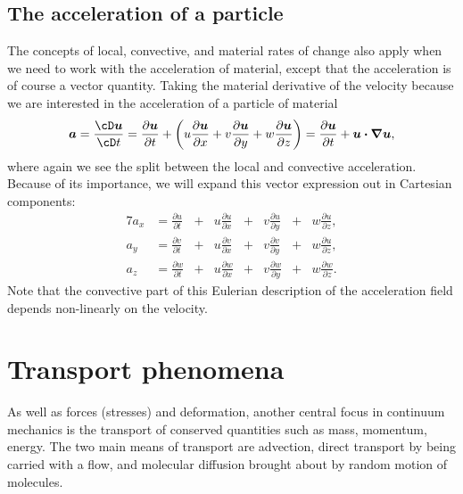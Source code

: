 \documentclass[twoside,11pt]		{report}
\begin{document}
\subsection{The acceleration of a particle}

The concepts of local, convective, and material rates of change also
apply when we need to work with the acceleration of material, except
that the acceleration is of course a vector quantity. Taking the
material derivative of the velocity because we are interested in the
acceleration of a particle of material
\[
\bm{a}=\frac{\cD\bm{u}}{\cD t}=
  \frac{\partial\bm{u}}{\partial t}+
  \left(u\frac{\partial\bm{u}}{\partial x}+
        v\frac{\partial\bm{u}}{\partial y}+
        w\frac{\partial\bm{u}}{\partial z}\right)=
  \frac{\partial\bm{u}}{\partial t}+\bm{u\cdot\nabla u}
,
\]
where again we see the split between the local and convective
acceleration.  Because of its importance, we will expand this vector
expression out in Cartesian components:
\begin{alignat*}{7}
a_x&=\frac{\partial u}{\partial t}&+&
    u\frac{\partial u}{\partial x}&+&
    v\frac{\partial u}{\partial y}&+&
    w\frac{\partial u}{\partial z},\\
a_y&=\frac{\partial v}{\partial t}&+&
    u\frac{\partial v}{\partial x}&+&
    v\frac{\partial v}{\partial y}&+&
    w\frac{\partial u}{\partial z},\\
a_z&=\frac{\partial w}{\partial t}&+&
    u\frac{\partial w}{\partial x}&+&
    v\frac{\partial w}{\partial y}&+&
    w\frac{\partial w}{\partial z}.
\end{alignat*}
Note that the convective part of this Eulerian description of the
acceleration field depends non-linearly on the velocity.

\section{Transport phenomena}

As well as forces (stresses) and deformation, another central focus in
continuum mechanics is the transport of conserved quantities such as
mass, momentum, energy. The two main means of transport are advection,
\ie direct transport by being carried with a flow, and molecular
diffusion brought about by random motion of molecules.

\end{document}

